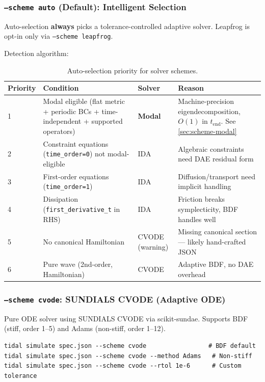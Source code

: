 \subsubsection{\texttt{--scheme auto} (Default): Intelligent Selection}
\label{sec:scheme-auto}

Auto-selection \textbf{always} picks a tolerance-controlled adaptive solver.
Leapfrog is opt-in only via \texttt{--scheme leapfrog}.

Detection algorithm:

\begin{table}[htbp]
\centering
\caption{Auto-selection priority for solver schemes.}
\label{tab:auto-selection}
\begin{tabular}{@{}llll@{}}
\toprule
Priority & Condition & Solver & Reason \\
\midrule
1 & Modal eligible (flat metric + periodic BCs + time-independent + supported operators) & \textbf{Modal} & Machine-precision eigendecomposition, $O(1)$ in $t_\mathrm{end}$. See \cref{sec:scheme-modal} \\
2 & Constraint equations (\texttt{time\_order=0}) not modal-eligible & IDA & Algebraic constraints need DAE residual form \\
3 & First-order equations (\texttt{time\_order=1}) & IDA & Diffusion/transport need implicit handling \\
4 & Dissipation (\texttt{first\_derivative\_t} in RHS) & IDA & Friction breaks symplecticity, BDF handles well \\
5 & No canonical Hamiltonian & CVODE (warning) & Missing canonical section --- likely hand-crafted JSON \\
6 & Pure wave (2nd-order, Hamiltonian) & CVODE & Adaptive BDF, no DAE overhead \\
\bottomrule
\end{tabular}
\end{table}

\subsubsection{\texttt{--scheme cvode}: SUNDIALS CVODE (Adaptive ODE)}
\label{sec:scheme-cvode}

Pure ODE solver using SUNDIALS CVODE via scikit-sundae. Supports BDF
(stiff, order 1--5) and Adams (non-stiff, order 1--12).

\begin{lstlisting}[style=bash]
tidal simulate spec.json --scheme cvode                 # BDF default
tidal simulate spec.json --scheme cvode --method Adams   # Non-stiff
tidal simulate spec.json --scheme cvode --rtol 1e-6      # Custom tolerance
\end{lstlisting}

